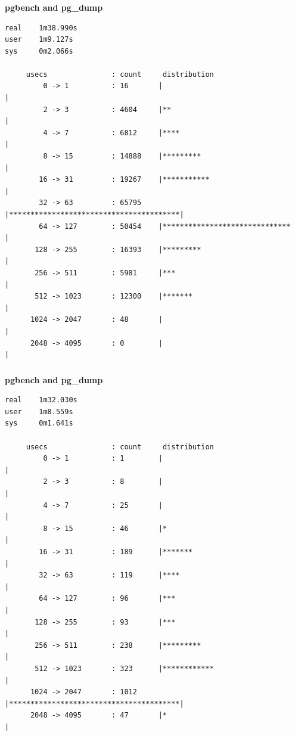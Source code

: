 \documentclass[usenames,dvipsnames, 18pt, compress, aspectratio=169]{beamer}
\begin{document}
\begin{frame}[fragile]{}
    \frametitle{}
    \begin{center}
    \textbf{pgbench and pg\_dump}

    \begin{verbatim}
real    1m38.990s
user    1m9.127s
sys     0m2.066s

     usecs               : count     distribution
         0 -> 1          : 16       |                                        |
         2 -> 3          : 4604     |**                                      |
         4 -> 7          : 6812     |****                                    |
         8 -> 15         : 14888    |*********                               |
        16 -> 31         : 19267    |***********                             |
        32 -> 63         : 65795    |****************************************|
        64 -> 127        : 50454    |******************************          |
       128 -> 255        : 16393    |*********                               |
       256 -> 511        : 5981     |***                                     |
       512 -> 1023       : 12300    |*******                                 |
      1024 -> 2047       : 48       |                                        |
      2048 -> 4095       : 0        |                                        |
        \end{verbatim}

    \end{center}
\end{frame}

\begin{frame}[fragile]{}
    \frametitle{}
    \begin{center}
    \textbf{pgbench and pg\_dump}

    \begin{verbatim}
real    1m32.030s
user    1m8.559s
sys     0m1.641s

     usecs               : count     distribution
         0 -> 1          : 1        |                                        |
         2 -> 3          : 8        |                                        |
         4 -> 7          : 25       |                                        |
         8 -> 15         : 46       |*                                       |
        16 -> 31         : 189      |*******                                 |
        32 -> 63         : 119      |****                                    |
        64 -> 127        : 96       |***                                     |
       128 -> 255        : 93       |***                                     |
       256 -> 511        : 238      |*********                               |
       512 -> 1023       : 323      |************                            |
      1024 -> 2047       : 1012     |****************************************|
      2048 -> 4095       : 47       |*                                       |
        \end{verbatim}

    \end{center}
\end{frame}
\end{document}
